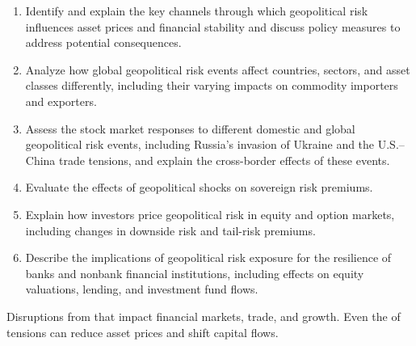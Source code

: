 
\begin{cikeybox}[title={The six objectives, in the spine's own words}]
\begin{enumerate}[label=\textbf{\alph*.}]
\item Identify and explain the key channels through which geopolitical risk influences asset
prices and financial stability and discuss policy measures to address potential consequences.
\item Analyze how global geopolitical risk events affect countries, sectors, and asset classes
differently, including their varying impacts on commodity importers and exporters.
\item Assess the stock market responses to different domestic and global geopolitical risk
events, including Russia's invasion of Ukraine and the U.S.--China trade tensions, and explain
the cross-border effects of these events.
\item Evaluate the effects of geopolitical shocks on sovereign risk premiums.
\item Explain how investors price geopolitical risk in equity and option markets, including
changes in downside risk and tail-risk premiums.
\item Describe the implications of geopolitical risk exposure for the resilience of banks and
nonbank financial institutions, including effects on equity valuations, lending, and
investment fund flows.
\end{enumerate}
\end{cikeybox}


\begin{cidefbox}[title={Geopolitical risk}]
Disruptions from  that impact
financial markets, trade, and growth. Even the  of tensions can reduce asset
prices and shift capital flows.
\end{cidefbox}

